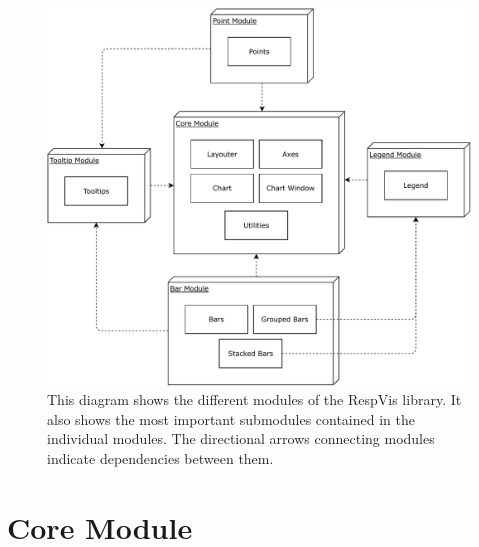 \begin{figure}[tp]
\centering
\includegraphics[keepaspectratio,width=\linewidth,height=\fullh]{diagrams/respvis-modules.pdf}
\caption[Modules of RespVis]{
  This diagram shows the different modules of the RespVis library.
  It also shows the most important submodules contained in the individual modules.
  The directional arrows connecting modules indicate dependencies between them. 
}
\label{fig:Modules}
\end{figure}


\section{Core Module}

